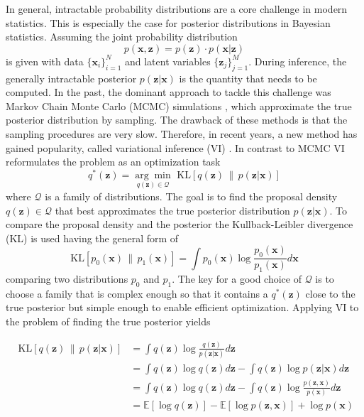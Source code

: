  In general, intractable probability distributions are a core challenge in modern statistics. This is especially the case for posterior distributions in Bayesian statistics. Assuming the joint probability distribution 
 \begin{equation}
      p(\textbf{x}, \textbf{z}) = p(\textbf{z}) \cdot p(\textbf{x} |\textbf{z})
 \end{equation}
 is given with data $\lbrace \textbf{x}_i \rbrace_{i=1}^N$ and latent variables $\lbrace \textbf{z}_j \rbrace_{j=1}^M$. During inference, the generally intractable posterior $p(\textbf{z} | \textbf{x})$ is the quantity that needs to be computed. In the past, the dominant approach to tackle this challenge was Markov Chain Monte Carlo (\gls{MCMC}) simulations  \cite{MCMC}, which approximate the true posterior distribution by sampling. The drawback of these methods is that the sampling procedures are very slow. Therefore, in recent years, a new method has gained popularity, called variational inference (\gls{VI}) \cite{ELBO}. In contrast to \gls{MCMC} \gls{VI} reformulates the problem as an optimization task 
 \begin{equation}
     q^*(\textbf{z}) = \underset{q(\textbf{z}) \in \mathscr{Q}}{\arg\min} \text{ KL} \left[ q(\textbf{z}) \,\|\, p(\textbf{z}|\textbf{x})\right] 
     \label{VI-objective}
 \end{equation}
where $\mathscr{Q}$ is a family of distributions. The goal is to find the proposal density $q(\textbf{z}) \in \mathscr{Q}$ that best approximates the true posterior distribution $p(\textbf{z}|\textbf{x})$. To compare the proposal density and the posterior the Kullback-Leibler divergence (\gls{KL}) \cite{KL-Div} is used having the general form of 
\begin{equation}
    \text{KL} [p_0(\textbf{x}) \,\|\,p_1(\textbf{x})]= \int p_0(\textbf{x}) \log \frac{p_0(\textbf{x})}{p_1(\textbf{x})} d\textbf{x}
\end{equation}
comparing two distributions $p_0$ and $p_1$.
The key for a good choice of $\mathscr{Q}$ is to choose a family that is complex enough so that it contains a $q^*(\textbf{z}) $ close to the true posterior but simple enough to enable efficient optimization. Applying \gls{VI} to the problem of finding the true posterior yields

\begin{align}
    \text{ KL} \left[ q(\textbf{z}) \,\|\, p(\textbf{z}|\textbf{x})\right] &= \int q(\textbf{z}) \log \frac{q(\textbf{z})}{p(\textbf{z}|\textbf{x})}d\textbf{z} \\
    &= \int q(\textbf{z}) \log q(\textbf{z}) d\textbf{z} - \int q(\textbf{z}) \log p(\textbf{z}|\textbf{x}) d\textbf{z} \\
    &= \int q(\textbf{z})  \log q(\textbf{z}) d\textbf{z} - \int q(\textbf{z}) \log \frac{p(\textbf{z},\textbf{x})}{p(\textbf{x})} d\textbf{z} \\
    &= \mathbb{E}\left[ \log q(\textbf{z}) \right] - \mathbb{E}\left[ \log p(\textbf{z},\textbf{x}) \right] + \log p(\textbf{x})
\end{align}

